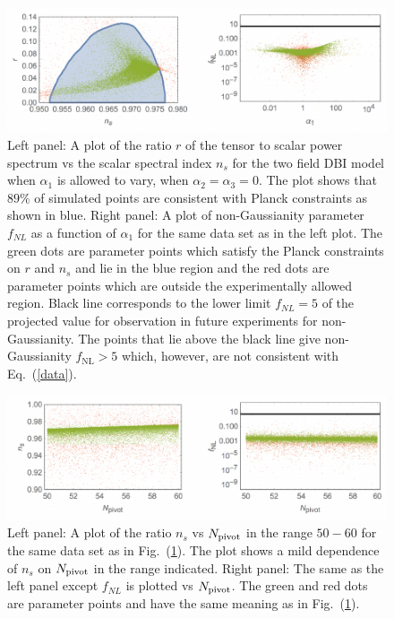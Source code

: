 \documentclass[a4paper,11pt]{article}
\begin{document}
  \begin{figure}
    \centering
    \includegraphics[width=1.0\textwidth]{figs/fig1.pdf}
    \caption{
      Left panel: A plot of the ratio $r$ of the tensor to scalar power spectrum vs the scalar spectral index $n_s$
      for the two field DBI model when $\alpha_1$ is allowed to vary, when $\alpha_2 = \alpha_3 = 0$. The plot shows that $89\%$ of simulated points are consistent with Planck constraints as shown in blue. Right panel: A plot of non-Gaussianity parameter $f_{NL}$ as
      a function of $\alpha_1$ for the same data set as in the left plot. The green dots are parameter points which satisfy the Planck constraints
      on $r$ and $n_s$ and lie in the blue region 
      and the red dots are parameter points which are outside the experimentally allowed region. Black line corresponds to the 
 lower limit $f_{NL} =5$ of the 
        projected value for observation in future experiments for non-Gaussianity.
           The points that lie above the black line give non-Gaussianity $f_\text{NL} > 5$ which, however, are not consistent with Eq.~(\ref{data}).
    }
    \label{fig1}
  \end{figure}

  \begin{figure}
    \centering
    \includegraphics[width=1.0\textwidth]{figs/fig2.pdf}
    \caption{Left panel: A plot of the ratio $n_s$ vs $N_{\rm pivot}$ in the range $50-60$ for the same data set as in Fig.~(\ref{fig1}).
    The plot shows a mild dependence of $n_s$ on $N_{\rm pivot}$ in the range indicated. Right panel: The same as the left panel except
    $f_{NL}$ is plotted vs $N_{\rm pivot}$.
    The green and red dots are parameter points and have the same meaning as in Fig.~(\ref{fig1}).}
    \label{fig2}
  \end{figure}
\end{document}
